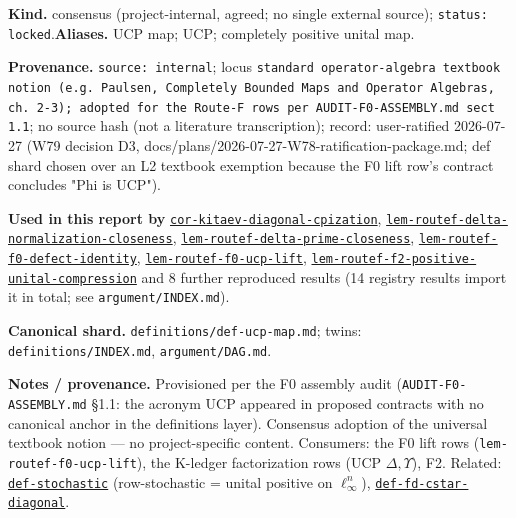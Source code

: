 \begin{defnote}
\textbf{Kind.} consensus (project-internal, agreed; no single external source); \texttt{status: locked}.\quad\textbf{Aliases.} UCP map; UCP; completely positive unital map.
\par
\textbf{Provenance.} \texttt{source: internal}; locus \texttt{standard operator-\allowbreak{}algebra textbook notion (e.\allowbreak{}g.\allowbreak{} Paulsen,\allowbreak{} Completely Bounded Maps and Operator Algebras,\allowbreak{} ch.\allowbreak{} 2-\allowbreak{}3);\allowbreak{} adopted for the Route-\allowbreak{}F rows per AUDIT-\allowbreak{}F0-\allowbreak{}ASSEMBLY.\allowbreak{}md sect 1.\allowbreak{}1}; no source hash (not a literature transcription); record: user-\allowbreak{}ratified 2026-\allowbreak{}07-\allowbreak{}27 (W79 decision D3,\allowbreak{} docs/\allowbreak{}plans/\allowbreak{}2026-\allowbreak{}07-\allowbreak{}27-\allowbreak{}W78-\allowbreak{}ratification-\allowbreak{}package.\allowbreak{}md;\allowbreak{} def shard chosen over an L2 textbook exemption because the F0 lift row's contract concludes "Phi is UCP").
\par
\textbf{Used in this report by} \hyperref[cor:kitaev-diagonal-cpization]{\texttt{cor-\allowbreak{}kitaev-\allowbreak{}diagonal-\allowbreak{}cpization}}, \hyperref[lem:routef-delta-normalization-closeness]{\texttt{lem-\allowbreak{}routef-\allowbreak{}delta-\allowbreak{}normalization-\allowbreak{}closeness}}, \hyperref[lem:routef-delta-prime-closeness]{\texttt{lem-\allowbreak{}routef-\allowbreak{}delta-\allowbreak{}prime-\allowbreak{}closeness}}, \hyperref[lem:routef-f0-defect-identity]{\texttt{lem-\allowbreak{}routef-\allowbreak{}f0-\allowbreak{}defect-\allowbreak{}identity}}, \hyperref[lem:routef-f0-ucp-lift]{\texttt{lem-\allowbreak{}routef-\allowbreak{}f0-\allowbreak{}ucp-\allowbreak{}lift}}, \hyperref[lem:routef-f2-positive-unital-compression]{\texttt{lem-\allowbreak{}routef-\allowbreak{}f2-\allowbreak{}positive-\allowbreak{}unital-\allowbreak{}compression}} and 8 further reproduced results (14 registry results import it in total; see \texttt{argument/INDEX.md}).
\par
\textbf{Canonical shard.} \texttt{definitions/\allowbreak{}def-\allowbreak{}ucp-\allowbreak{}map.\allowbreak{}md}; twins: \texttt{definitions/INDEX.md}, \texttt{argument/DAG.md}.
\par
\textbf{Notes / provenance.} Provisioned per the F0 assembly audit
(\texttt{AUDIT-\allowbreak{}F0-\allowbreak{}ASSEMBLY.\allowbreak{}md} \S{}1.1: the acronym UCP appeared in proposed
contracts with no canonical anchor in the definitions layer). Consensus
adoption of the universal textbook notion --- no project-specific content.
Consumers: the F0 lift rows (\texttt{lem-\allowbreak{}routef-\allowbreak{}f0-\allowbreak{}ucp-\allowbreak{}lift}), the K-ledger
factorization rows (UCP $\Delta,\Upsilon$), F2. Related:
\hyperref[def:stochastic]{\texttt{def-\allowbreak{}stochastic}} (row-stochastic = unital positive on $\ell_\infty^n$),
\hyperref[def:fd-cstar-diagonal]{\texttt{def-\allowbreak{}fd-\allowbreak{}cstar-\allowbreak{}diagonal}}.
\end{defnote}

